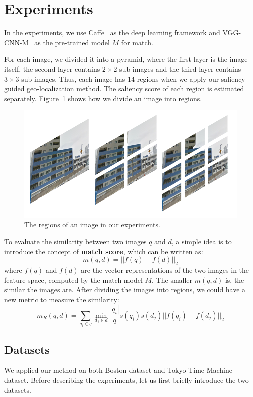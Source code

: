 \section{Experiments}
\par
In the experiments, we use Caffe~\cite{jia2014caffe} as the deep learning framework and VGG-CNN-M~\cite{chatfield2014return} as the pre-trained model $M$ for match. 
\par
For each image, we divided it into a pyramid, where the first layer is the image itself, the second layer contains $2 \times 2$ sub-images and the third layer contains $3 \times 3$ sub-images. Thus, each image has 14 regions when we apply our saliency guided geo-localization method. The saliency score of each region is estimated separately. Figure~\ref{fig:pyramid} shows how we divide an image into regions. 
\begin{figure}[htbp]
\includegraphics*[width=0.9\linewidth]{img/regions}
\caption{The regions of an image in our experiments.}
\label{fig:pyramid}
\end{figure}
\par
To evaluate the similarity between two images $q$ and $d$, a simple idea is to introduce the concept of \textbf{match score}, which can be written as:
\begin{equation}
m(q, d) =  ||f(q) - f(d)||_2
\label{eq-6}
\end{equation}
where $f(q)$ and $f(d)$ are the vector representations of the two images in the feature space, computed by the match model $M$. The smaller $m(q,d)$ is, the similar the images are. After dividing the images into regions, we could have a new metric to measure the similarity:
\begin{equation}
m_R(q,d) = \sum_{q_i \in q} \min_{d_j\in d} \frac{|q_i|}{|q|} s(q_i)s(d_j) ||f(q_i)-f(d_j)||_2
\label{eq-7}
\end{equation}
\subsection{Datasets}
We applied our method on both Boston dataset and Tokyo Time Machine dataset. Before describing the experiments, let us first briefly introduce the two datasets. 

